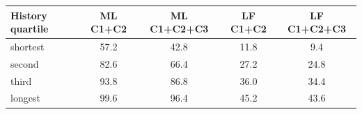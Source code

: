 \begin{tabular}{lcccc}
\toprule
History quartile & ML C1+C2 & ML C1+C2+C3 & LF C1+C2 & LF C1+C2+C3 \\
\midrule
shortest & 57.2 & 42.8 & 11.8 & 9.4 \\
second & 82.6 & 66.4 & 27.2 & 24.8 \\
third & 93.8 & 86.8 & 36.0 & 34.4 \\
longest & 99.6 & 96.4 & 45.2 & 43.6 \\
\bottomrule
\end{tabular}
